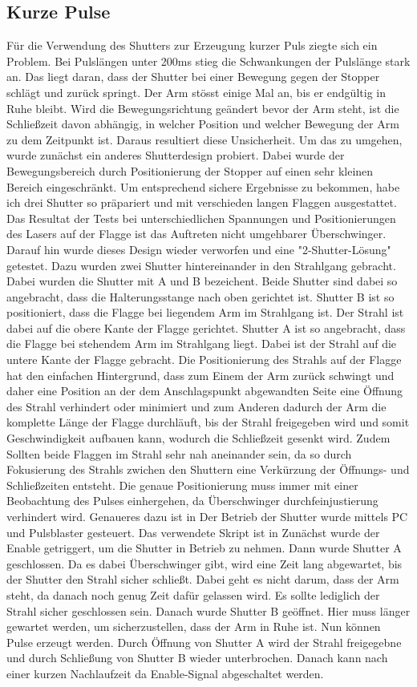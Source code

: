 \subsection{Kurze Pulse}
Für die Verwendung des Shutters zur Erzeugung kurzer Puls ziegte sich ein Problem. Bei Pulslängen unter 200ms stieg die Schwankungen der Pulslänge stark an. Das liegt daran, dass der Shutter bei einer Bewegung gegen der Stopper schlägt und zurück springt. Der Arm stösst einige Mal an, bis er endgültig in Ruhe bleibt. Wird die Bewegungsrichtung geändert bevor der Arm steht, ist die Schließzeit davon abhängig, in welcher Position und welcher Bewegung der Arm zu dem Zeitpunkt ist. Daraus resultiert diese Unsicherheit. Um das zu umgehen, wurde zunächst ein anderes Shutterdesign probiert. Dabei wurde der Bewegungsbereich durch Positionierung der Stopper auf einen sehr kleinen Bereich eingeschränkt. Um entsprechend sichere Ergebnisse zu bekommen, habe ich drei Shutter so präpariert und mit verschieden langen Flaggen ausgestattet. Das Resultat der Tests bei unterschiedlichen Spannungen und Positionierungen des Lasers auf der Flagge ist das Auftreten nicht umgehbarer Überschwinger. Darauf hin wurde dieses Design wieder verworfen und eine "2-Shutter-Lösung" getestet. Dazu wurden zwei Shutter hintereinander in den Strahlgang gebracht. Dabei wurden die Shutter mit A und B bezeichent. Beide Shutter sind dabei so angebracht, dass die Halterungsstange nach oben gerichtet ist. Shutter B ist so positioniert, dass die Flagge bei liegendem Arm im Strahlgang ist. Der Strahl ist dabei auf die obere Kante der Flagge gerichtet. Shutter A ist so angebracht, dass die Flagge bei stehendem Arm im Strahlgang liegt. Dabei ist der Strahl auf die untere Kante der Flagge gebracht. Die Positionierung des Strahls auf der Flagge hat den einfachen Hintergrund, dass zum Einem der Arm zurück schwingt und daher eine Position an der dem Anschlagspunkt abgewandten Seite eine Öffnung des Strahl verhindert oder minimiert und zum Anderen dadurch der Arm die komplette Länge der Flagge durchläuft, bis der Strahl freigegeben wird und somit Geschwindigkeit aufbauen kann, wodurch die Schließzeit gesenkt wird. Zudem Sollten beide Flaggen im Strahl sehr nah aneinander sein, da so durch Fokusierung des Strahls zwichen den Shuttern eine Verkürzung der Öffnungs- und Schließzeiten entsteht. Die genaue Positionierung muss immer mit einer Beobachtung des Pulses einhergehen, da Überschwinger durchfeinjustierung verhindert wird. Genaueres dazu ist in %
Der Betrieb der Shutter wurde mittels PC und Pulsblaster gesteuert. Das verwendete Skript ist in %
Zunächst wurde der Enable getriggert, um die Shutter in Betrieb zu nehmen. Dann wurde Shutter A geschlossen. Da es dabei Überschwinger gibt, wird eine Zeit lang abgewartet, bis der Shutter den Strahl sicher schließt. Dabei geht es nicht darum, dass der Arm steht, da danach noch genug Zeit dafür gelassen wird. Es sollte lediglich der Strahl sicher geschlossen sein. Danach wurde Shutter B geöffnet. Hier muss länger gewartet werden, um sicherzustellen, dass der Arm in Ruhe ist. Nun können Pulse erzeugt werden. Durch Öffnung von Shutter A wird der Strahl freigegebne und durch Schließung von Shutter B wieder unterbrochen. Danach kann nach einer kurzen Nachlaufzeit da Enable-Signal abgeschaltet werden. 